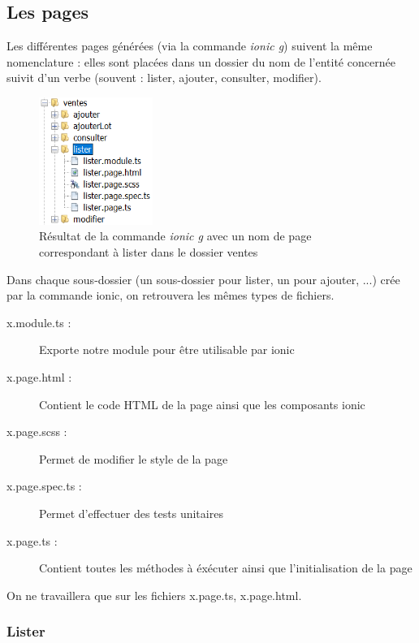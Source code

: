 		\subsection{Les pages}

			Les différentes pages générées (via la commande \textit{ionic g}) suivent la même nomenclature : elles sont placées dans un dossier du nom de l'entité concernée suivit d'un verbe (souvent : lister, ajouter, consulter, modifier). \newline

			\begin{figure}[H]
				\centering\includegraphics[width=0.33\textwidth, keepaspectratio]{res/ionicListerVentes.png}
				\caption{Résultat de la commande \textit{ionic g} avec un nom de page correspondant à lister dans le dossier ventes}
			\end{figure}

			\noindent
			Dans chaque sous-dossier (un sous-dossier pour lister, un pour ajouter, ...) crée par la commande ionic, on retrouvera les mêmes types de fichiers.\newline

			\begin{description}
				\item[x.module.ts :]{Exporte notre module pour être utilisable par ionic}
				\item[x.page.html :]{Contient le code HTML de la page ainsi que les composants ionic}
				\item[x.page.scss :]{Permet de modifier le style de la page}
				\item[x.page.spec.ts :]{Permet d'effectuer des tests unitaires}
				\item[x.page.ts :]{Contient toutes les méthodes à éxécuter ainsi que l'initialisation de la page}
			\end{description}

			\noindent
			On ne travaillera que sur les fichiers x.page.ts, x.page.html.

			\subsubsection{Lister}

